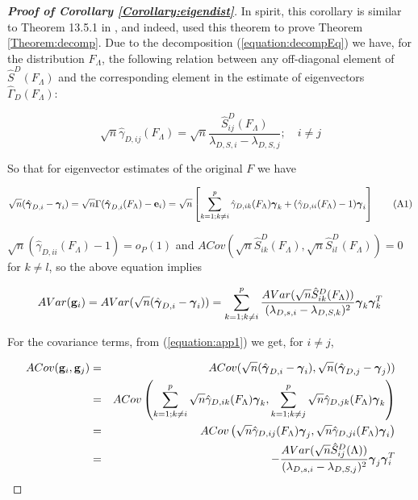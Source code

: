 \documentclass[fleqn,11pt]{article}
\begin{document}
\begin{proof}[\textbf{Proof of Corollary \ref{Corollary:eigendist}}]
In spirit, this corollary is similar to Theorem 13.5.1 in \cite{anderson}, and indeed, \cite{taskinen12} used this theorem to prove Theorem \ref{Theorem:decomp}. Due to the decomposition (\ref{equation:decompEq}) we have, for the distribution $F_\Lambda$, the following relation between any off-diagonal element of $\hat S^D(F_\Lambda)$ and the corresponding element in the estimate of eigenvectors $\hat\Gamma_D (F_\Lambda)$:

$$ \sqrt n \hat\gamma_{D,ij} (F_\Lambda) = \sqrt n \frac{\hat S^D_{ij} (F_\Lambda)}{\lambda_{D,S,i} - \lambda_{D,S,j}}; \quad i \neq j$$

So that for eigenvector estimates of the original $F$ we have

\begin{equation} \label{equation:app1}
\sqrt n (\hat{{\boldsymbol{\gamma}}}_{D,i} - {\boldsymbol{\gamma}}_i) = \sqrt n \Gamma (\hat {{\boldsymbol{\gamma}}}_{D,i}(F_\Lambda) - {\bf{e}}_i ) = \sqrt n \left[ \sum_{k=1; k \neq i}^p \hat \gamma_{D,ik}(F_\Lambda){\boldsymbol{\gamma}}_k + (\hat \gamma_{D,ii}(F_\Lambda) - 1){\boldsymbol{\gamma}}_i \right] \tag{A1}
\end{equation}

$\sqrt n (\hat \gamma_{D,ii}(F_\Lambda) - 1) =  o_P(1)$ and $ACov(\sqrt n \hat S^D_{ik}(F_\Lambda), \sqrt n \hat S^D_{il}(F_\Lambda)) = 0$ for $k \neq l$, so the above equation implies

$$ AVar({\bf{g}}_i) = AVar (\sqrt n (\hat{{\boldsymbol{\gamma}}}_{D,i} - {\boldsymbol{\gamma}}_i)) = \sum_{k=1; k \neq i}^p \frac{AVar(\sqrt n \hat S^D_{ik}(F_\Lambda))}{(\lambda_{D,s,i} - \lambda_{D,S,k})^2} {\boldsymbol{\gamma}}_k {\boldsymbol{\gamma}}_k^T $$

For the covariance terms, from (\ref{equation:app1}) we get, for $i \neq j$,

\begin{eqnarray*}
ACov({\bf{g}}_i, {\bf{g}}_j) &=& ACov (\sqrt n (\hat{{\boldsymbol{\gamma}}}_{D,i} - {\boldsymbol{\gamma}}_i), \sqrt n (\hat{{\boldsymbol{\gamma}}}_{D,j} - {\boldsymbol{\gamma}}_j))\\
&=& ACov \left( \sum_{k=1; k \neq i}^p \sqrt n \hat \gamma_{D,ik}(F_\Lambda){\boldsymbol{\gamma}}_k, \sum_{k=1; k \neq j}^p \sqrt n \hat \gamma_{D,jk}(F_\Lambda){\boldsymbol{\gamma}}_k \right)\\
&=& ACov \left( \sqrt n \hat \gamma_{D,ij}(F_\Lambda){\boldsymbol{\gamma}}_j, \sqrt n \hat \gamma_{D,ji}(F_\Lambda){\boldsymbol{\gamma}}_i \right)\\
&=& - \frac{AVar(\sqrt n \hat S^D_{ij}(\Lambda))}{(\lambda_{D,s,i} - \lambda_{D,S,j})^2} {\boldsymbol{\gamma}}_j {\boldsymbol{\gamma}}_i^T
\end{eqnarray*}


\end{proof}
\end{document}
